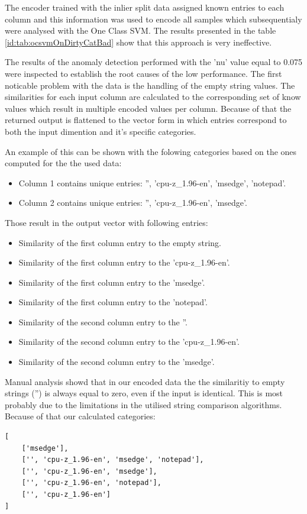 \documentclass[a4paper,twoside,12pt]{book}
\begin{document}
The encoder trained with the inlier split data assigned known entries to each column and this 
information was used to encode all samples which subsequentialy were analysed with the One Class
SVM. The results presented in the table \ref{id:tab:ocsvmOnDirtyCatBad} show that this approach is 
very ineffective. 

The results of the anomaly detection performed with the 'nu' value equal to 0.075 were inspected 
to establish the root causes of the low performance. The first noticable problem with the data
is the handling of the empty string values. The similarities for each input column are 
calculated to the corresponding set of know values which result in multiple encoded values per
column. Because of that the returned output is flattened to the vector form in which entries
correspond to both the input dimention and it's specific categories. 

An example of this can be shown with the folowing categories based on the ones computed 
for the the used data:
\begin{itemize}
	\item Column 1 contains unique entries: '', 'cpu-z\_1.96-en', 'msedge', 'notepad'.
	\item Column 2 contains unique entries: '', 'cpu-z\_1.96-en', 'msedge'.
\end{itemize}

Those result in the output vector with following entries:
\begin{itemize}
	\item Similarity of the first column entry to the empty string.
	\item Similarity of the first column entry to the 'cpu-z\_1.96-en'.
	\item Similarity of the first column entry to the 'msedge'.
	\item Similarity of the first column entry to the 'notepad'.
	\item Similarity of the second column entry to the ''.
	\item Similarity of the second column entry to the 'cpu-z\_1.96-en'.
	\item Similarity of the second column entry to the 'msedge'.
\end{itemize}

Manual analysis showd that in our encoded data the the similaritiy to empty strings ('') is 
always equal to zero, even if the input is identical. This is most probably due to the limitations 
in the utilised string comparison algorithms. Because of that our calculated categories:
\begin{lstlisting}
[
	['msedge'],
	['', 'cpu-z_1.96-en', 'msedge', 'notepad'],
 	['', 'cpu-z_1.96-en', 'msedge'],
	['', 'cpu-z_1.96-en', 'notepad'],
 	['', 'cpu-z_1.96-en']
]
\end{lstlisting}
\end{document}
